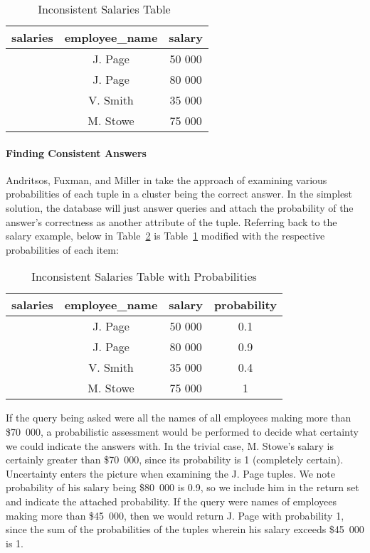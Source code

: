 \documentclass[a4paper]{report}
\begin{document}
\begin{table}[h]\begin{center}
        \begin{tabular}{r | c  c} 
					salaries & employee\_name & salary \\ \hline
	           		 & J. Page  & 50 000 \\ 
	         		 & J. Page  & 80 000 \\ 
					 & V. Smith & 35 000 \\ 
					 & M. Stowe & 75 000 \\ 
        \end{tabular}
        \caption[Inconsistent Salaries Table]{Inconsistent Salaries Table~\cite{CQ}\label{inconsistent1}}
\end{center}\end{table}

\paragraph{Finding Consistent Answers}
Andritsos, Fuxman, and Miller in \cite{CA} take the approach of examining various probabilities of each tuple in a cluster being the correct answer. In the simplest solution, the database will just answer queries and attach the probability of the answer's correctness as another attribute of the tuple. Referring back to the salary example, below in Table~\ref{inconsistent2} is Table~\ref{inconsistent1} modified with the respective probabilities of each item:


\begin{table}[h]\begin{center}
        \begin{tabular}{r | c  c  c} 
					salaries & employee\_name & salary & probability\\ \hline
	           		 & J. Page  & 50 000 & 0.1 \\ 
	         		 & J. Page  & 80 000 & 0.9 \\ 
					 & V. Smith & 35 000 & 0.4 \\ 
					 & M. Stowe & 75 000 & 1 \\ 
        \end{tabular}
        \caption[Inconsistent Salaries Table with Probabilities]{Inconsistent Salaries Table with Probabilities \cite{CQ} \cite{CA}\label{inconsistent2}}
\end{center}\end{table}

If the query being asked were all the names of all employees making more than \$70~000, a probabilistic assessment would be performed to decide what certainty we could indicate the answers with. In the trivial case, M. Stowe's salary is certainly greater than \$70~000, since its probability is 1 (completely certain). Uncertainty enters the picture when examining the J. Page tuples. We note probability of his salary being \$80~000 is 0.9, so we include him in the return set and indicate the attached probability. If the query were names of employees making more than \$45~000, then we would return J. Page with probability 1, since the sum of the probabilities of the tuples wherein his salary exceeds \$45~000 is 1. 
\end{document}
